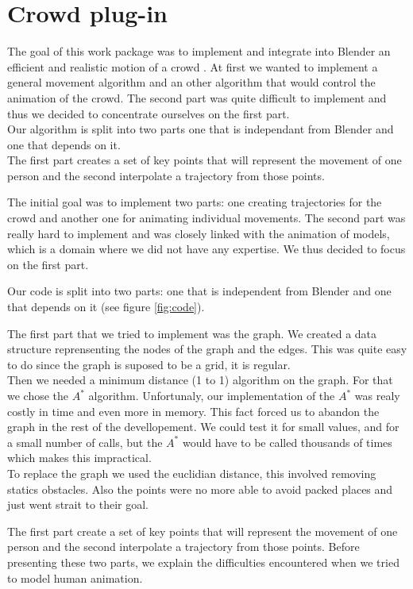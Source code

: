 \section{Crowd plug-in}


The goal of this work package was to implement and integrate into Blender an efficient and realistic motion of a crowd . At first we wanted to implement a general movement algorithm and an other algorithm that would control the animation of the crowd. The second part was quite difficult to implement and thus we decided to concentrate ourselves on the first part.\\
Our algorithm is split into two parts one that is independant from Blender and one that depends on it. \\
The first part creates a set of key points that will represent the movement of one person and the second interpolate a trajectory from those points.


The initial goal was to implement two parts: one creating trajectories
for the crowd and another one for animating individual movements. The
second part was really hard to implement and was closely linked with
the animation of models, which is a domain where we did not have any
expertise. We thus decided to focus on the first part.


Our code is split into two parts: one that is independent from Blender
and one that depends on it (see figure \ref{fig:code}).


The first part that we tried to implement was the graph. We created a data structure reprensenting the nodes of the graph and the edges. This was quite easy to do since the graph is suposed to be a grid, it is regular.\\
Then we needed a minimum distance (1 to 1) algorithm on the graph. For that we chose the $A^*$ algorithm. Unfortunaly, our implementation of the $A^*$ was realy costly in time and even more in memory. This fact forced us to abandon the graph in the rest of the devellopement. We could test it for small values, and for a small number of calls, but the $A^*$ would have to be called thousands of times which makes this impractical.\\ 
To replace the graph we used the euclidian distance, this involved removing statics obstacles. Also the points were no more able to avoid packed places and just went strait to their goal.


The first part create a set of key points that will represent the
movement of one person and the second interpolate a trajectory from
those points. Before presenting these two parts, we explain the
difficulties encountered when we tried to model human animation.


